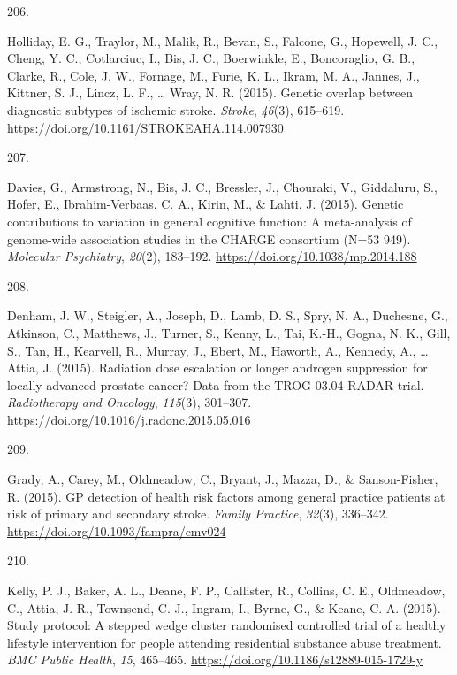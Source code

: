 \documentclass[11pt, a4paper]{awesome-cv}
\newlength{\csllabelwidth}
\newcommand{\CSLLeftMargin}[1]{\parbox[t]{\csllabelwidth}{#1}}
\newcommand{\CSLRightInline}[1]{\parbox[t]{\linewidth - \csllabelwidth}{#1}}
\begin{document}
\leavevmode\hypertarget{ref-holliday_genetic_2015}{}%
\CSLLeftMargin{206. }
\CSLRightInline{Holliday, E. G., Traylor, M., Malik, R., Bevan, S.,
Falcone, G., Hopewell, J. C., Cheng, Y. C., Cotlarciuc, I., Bis, J. C.,
Boerwinkle, E., Boncoraglio, G. B., Clarke, R., Cole, J. W., Fornage,
M., Furie, K. L., Ikram, M. A., Jannes, J., Kittner, S. J., Lincz, L.
F., \ldots{} Wray, N. R. (2015). Genetic overlap between diagnostic
subtypes of ischemic stroke. \emph{Stroke}, \emph{46}(3), 615--619.
\url{https://doi.org/10.1161/STROKEAHA.114.007930}}

\leavevmode\hypertarget{ref-davies_genetic_2015}{}%
\CSLLeftMargin{207. }
\CSLRightInline{Davies, G., Armstrong, N., Bis, J. C., Bressler, J.,
Chouraki, V., Giddaluru, S., Hofer, E., Ibrahim-Verbaas, C. A., Kirin,
M., \& Lahti, J. (2015). Genetic contributions to variation in general
cognitive function: A meta-analysis of genome-wide association studies
in the CHARGE consortium (N=53 949). \emph{Molecular Psychiatry},
\emph{20}(2), 183--192. \url{https://doi.org/10.1038/mp.2014.188}}

\leavevmode\hypertarget{ref-denham_radiation_2015}{}%
\CSLLeftMargin{208. }
\CSLRightInline{Denham, J. W., Steigler, A., Joseph, D., Lamb, D. S.,
Spry, N. A., Duchesne, G., Atkinson, C., Matthews, J., Turner, S.,
Kenny, L., Tai, K.-H., Gogna, N. K., Gill, S., Tan, H., Kearvell, R.,
Murray, J., Ebert, M., Haworth, A., Kennedy, A., \ldots{} Attia, J.
(2015). Radiation dose escalation or longer androgen suppression for
locally advanced prostate cancer? Data from the TROG 03.04 RADAR trial.
\emph{Radiotherapy and Oncology}, \emph{115}(3), 301--307.
\url{https://doi.org/10.1016/j.radonc.2015.05.016}}

\leavevmode\hypertarget{ref-grady_gp_2015}{}%
\CSLLeftMargin{209. }
\CSLRightInline{Grady, A., Carey, M., Oldmeadow, C., Bryant, J., Mazza,
D., \& Sanson-Fisher, R. (2015). GP detection of health risk factors
among general practice patients at risk of primary and secondary stroke.
\emph{Family Practice}, \emph{32}(3), 336--342.
\url{https://doi.org/10.1093/fampra/cmv024}}

\leavevmode\hypertarget{ref-kelly_study_2015}{}%
\CSLLeftMargin{210. }
\CSLRightInline{Kelly, P. J., Baker, A. L., Deane, F. P., Callister, R.,
Collins, C. E., Oldmeadow, C., Attia, J. R., Townsend, C. J., Ingram,
I., Byrne, G., \& Keane, C. A. (2015). Study protocol: A stepped wedge
cluster randomised controlled trial of a healthy lifestyle intervention
for people attending residential substance abuse treatment. \emph{BMC
Public Health}, \emph{15}, 465--465.
\url{https://doi.org/10.1186/s12889-015-1729-y}}
\end{document}
